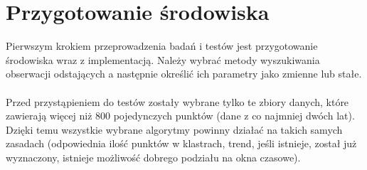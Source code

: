 \documentclass[eng,printmode]{mgr}
\begin{document}
\section{Przygotowanie środowiska}
Pierwszym krokiem przeprowadzenia badań i testów jest przygotowanie środowiska wraz z implementacją. Należy wybrać metody wyszukiwania obserwacji odstających a następnie określić ich parametry jako zmienne lub stałe.
\\\\
Przed przystąpieniem do testów zostały wybrane tylko te zbiory danych, które zawierają więcej niż 800 pojedynczych punktów (dane z co najmniej dwóch lat). Dzięki temu wszystkie wybrane algorytmy powinny działać na takich samych zasadach (odpowiednia ilość punktów w klastrach, trend, jeśli istnieje, został już wyznaczony, istnieje możliwość dobrego podziału na okna czasowe).
\end{document}
